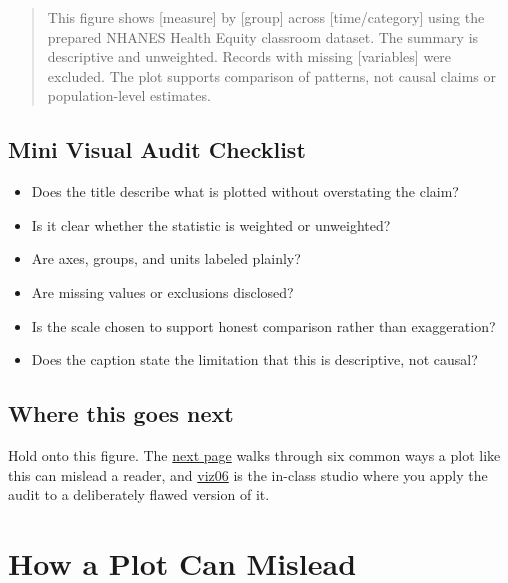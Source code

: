 \documentclass[
  letterpaper,
  DIV=11,
  numbers=noendperiod,
  oneside]{scrreprt}
\providecommand{\tightlist}{%
  \setlength{\itemsep}{0pt}\setlength{\parskip}{0pt}}
\begin{document}
\begin{quote}
This figure shows {[}measure{]} by {[}group{]} across
{[}time/category{]} using the prepared NHANES Health Equity classroom
dataset. The summary is descriptive and unweighted. Records with missing
{[}variables{]} were excluded. The plot supports comparison of patterns,
not causal claims or population-level estimates.
\end{quote}

\section*{Mini Visual Audit
Checklist}\label{mini-visual-audit-checklist}


\begin{itemize}
\tightlist
\item
  Does the title describe what is plotted without overstating the claim?
\item
  Is it clear whether the statistic is weighted or unweighted?
\item
  Are axes, groups, and units labeled plainly?
\item
  Are missing values or exclusions disclosed?
\item
  Is the scale chosen to support honest comparison rather than
  exaggeration?
\item
  Does the caption state the limitation that this is descriptive, not
  causal?
\end{itemize}

\section*{Where this goes next}\label{where-this-goes-next-2}


Hold onto this figure. The \href{viz04-misleading-design.qmd}{next page}
walks through six common ways a plot like this can mislead a reader, and
\href{viz06-studio-visual-audit.qmd}{viz06} is the in-class studio where
you apply the audit to a deliberately flawed version of it.

\chapter*{How a Plot Can Mislead}\label{how-a-plot-can-mislead}
\end{document}
